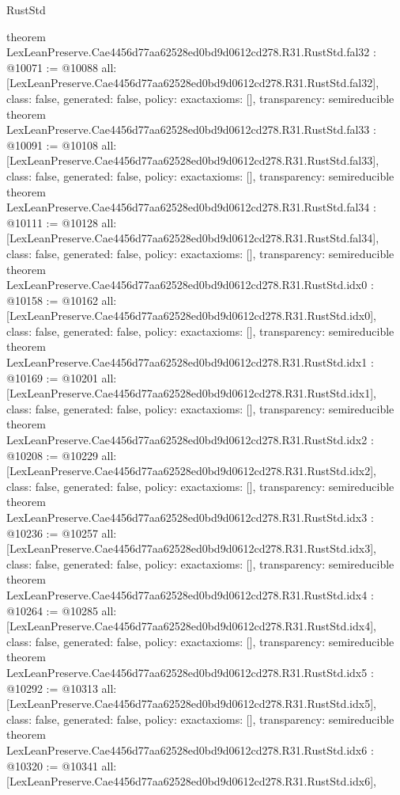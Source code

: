 \begin{lexlean}{RustStd}
\begin{coremodule}
{}
theorem LexLeanPreserve.Cae4456d77aa62528ed0bd9d0612cd278.R31.RustStd.fal32 : @10071 := @10088 {
  all: [LexLeanPreserve.Cae4456d77aa62528ed0bd9d0612cd278.R31.RustStd.fal32],
  class: false,
  generated: false,
  policy: exact{axioms: []},
  transparency: semireducible
}
theorem LexLeanPreserve.Cae4456d77aa62528ed0bd9d0612cd278.R31.RustStd.fal33 : @10091 := @10108 {
  all: [LexLeanPreserve.Cae4456d77aa62528ed0bd9d0612cd278.R31.RustStd.fal33],
  class: false,
  generated: false,
  policy: exact{axioms: []},
  transparency: semireducible
}
theorem LexLeanPreserve.Cae4456d77aa62528ed0bd9d0612cd278.R31.RustStd.fal34 : @10111 := @10128 {
  all: [LexLeanPreserve.Cae4456d77aa62528ed0bd9d0612cd278.R31.RustStd.fal34],
  class: false,
  generated: false,
  policy: exact{axioms: []},
  transparency: semireducible
}
theorem LexLeanPreserve.Cae4456d77aa62528ed0bd9d0612cd278.R31.RustStd.idx0 : @10158 := @10162 {
  all: [LexLeanPreserve.Cae4456d77aa62528ed0bd9d0612cd278.R31.RustStd.idx0],
  class: false,
  generated: false,
  policy: exact{axioms: []},
  transparency: semireducible
}
theorem LexLeanPreserve.Cae4456d77aa62528ed0bd9d0612cd278.R31.RustStd.idx1 : @10169 := @10201 {
  all: [LexLeanPreserve.Cae4456d77aa62528ed0bd9d0612cd278.R31.RustStd.idx1],
  class: false,
  generated: false,
  policy: exact{axioms: []},
  transparency: semireducible
}
theorem LexLeanPreserve.Cae4456d77aa62528ed0bd9d0612cd278.R31.RustStd.idx2 : @10208 := @10229 {
  all: [LexLeanPreserve.Cae4456d77aa62528ed0bd9d0612cd278.R31.RustStd.idx2],
  class: false,
  generated: false,
  policy: exact{axioms: []},
  transparency: semireducible
}
theorem LexLeanPreserve.Cae4456d77aa62528ed0bd9d0612cd278.R31.RustStd.idx3 : @10236 := @10257 {
  all: [LexLeanPreserve.Cae4456d77aa62528ed0bd9d0612cd278.R31.RustStd.idx3],
  class: false,
  generated: false,
  policy: exact{axioms: []},
  transparency: semireducible
}
theorem LexLeanPreserve.Cae4456d77aa62528ed0bd9d0612cd278.R31.RustStd.idx4 : @10264 := @10285 {
  all: [LexLeanPreserve.Cae4456d77aa62528ed0bd9d0612cd278.R31.RustStd.idx4],
  class: false,
  generated: false,
  policy: exact{axioms: []},
  transparency: semireducible
}
theorem LexLeanPreserve.Cae4456d77aa62528ed0bd9d0612cd278.R31.RustStd.idx5 : @10292 := @10313 {
  all: [LexLeanPreserve.Cae4456d77aa62528ed0bd9d0612cd278.R31.RustStd.idx5],
  class: false,
  generated: false,
  policy: exact{axioms: []},
  transparency: semireducible
}
theorem LexLeanPreserve.Cae4456d77aa62528ed0bd9d0612cd278.R31.RustStd.idx6 : @10320 := @10341 {
  all: [LexLeanPreserve.Cae4456d77aa62528ed0bd9d0612cd278.R31.RustStd.idx6],
}
\end{coremodule}
\end{lexlean}
